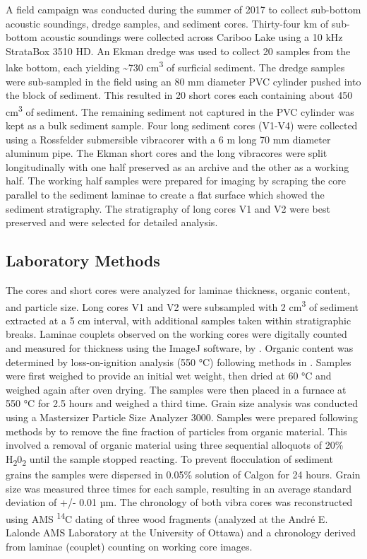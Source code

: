 \documentclass[Royal,times,doublespace,sageh]{sagej}
\begin{document}
A field campaign was conducted during the summer of 2017 to collect
sub-bottom acoustic soundings, dredge samples, and sediment cores.
Thirty-four km of sub-bottom acoustic soundings were collected across
Cariboo Lake using a 10 kHz StrataBox 3510 HD. An Ekman dredge was used
to collect 20 samples from the lake bottom, each yielding
\textasciitilde730 cm\textsuperscript{3} of surficial sediment. The
dredge samples were sub-sampled in the field using an 80 mm diameter PVC
cylinder pushed into the block of sediment. This resulted in 20 short
cores each containing about 450 cm\textsuperscript{3} of sediment. The
remaining sediment not captured in the PVC cylinder was kept as a bulk
sediment sample. Four long sediment cores (V1-V4) were collected using a
Rossfelder submersible vibracorer with a 6 m long 70 mm diameter
aluminum pipe. The Ekman short cores and the long vibracores were split
longitudinally with one half preserved as an archive and the other as a
working half. The working half samples were prepared for imaging by
scraping the core parallel to the sediment laminae to create a flat
surface which showed the sediment stratigraphy. The stratigraphy of long
cores V1 and V2 were best preserved and were selected for detailed
analysis.

\hypertarget{laboratory-methods}{%
\subsection{Laboratory Methods}\label{laboratory-methods}}

The cores and short cores were analyzed for laminae thickness, organic
content, and particle size. Long cores V1 and V2 were subsampled with 2
cm\textsuperscript{3} of sediment extracted at a 5 cm interval, with
additional samples taken within stratigraphic breaks. Laminae couplets
observed on the working cores were digitally counted and measured for
thickness using the ImageJ software, by \citet{Schneider2012}. Organic
content was determined by loss-on-ignition analysis (550 °C) following
methods in \citet{Smith2003}. Samples were first weighed to provide an
initial wet weight, then dried at 60 °C and weighed again after oven
drying. The samples were then placed in a furnace at 550 °C for 2.5
hours and weighed a third time. Grain size analysis was conducted using
a Mastersizer Particle Size Analyzer 3000. Samples were prepared
following methods by \citet{Gray2010} to remove the fine fraction of
particles from organic material. This involved a removal of organic
material using three sequential alloquots of 20\%
H\textsubscript{2}0\textsubscript{2} until the sample stopped reacting.
To prevent flocculation of sediment grains the samples were dispersed in
0.05\% solution of Calgon for 24 hours. Grain size was measured three
times for each sample, resulting in an average standard deviation of +/-
0.01 µm. The chronology of both vibra cores was reconstructed using AMS
\textsuperscript{14}C dating of three wood fragments (analyzed at the
André E. Lalonde AMS Laboratory at the University of Ottawa) and a
chronology derived from laminae (couplet) counting on working core
images.
\end{document}
